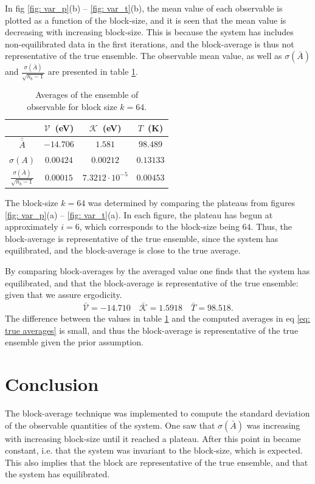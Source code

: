 \documentclass[a4paper]{article}
\newcommand{\newparagraph}{\vspace{.5cm}\noindent}
\begin{document}
\newparagraph
In fig \ref{fig: var_p}(b) -- \ref{fig: var_t}(b), the mean value of each observable is plotted as a function of the block-size, and it is seen that the mean value is decreasing with increasing block-size.
This is because the system has includes non-equilibrated data in the first iterations, and the block-average is thus not representative of the true ensemble.
The observable mean value, as well as $\sigma(\bar{A})$ and $\frac{\sigma(\bar{A})}{\sqrt{n_b - 1}}$ are presented in table \ref{ref: observables}.
\begin{table}[H]
    \centering
    \caption{Averages of the ensemble of\\ observable for block size $k = 64$.}
    \label{ref: observables}
    \begin{tabular}{|c|c|c|c|}\hline
        &$\mathcal{V}$~(eV) & $\mathcal{K}$~(eV) & $T$~(K)\\\hline
        $\bar{\bar{A}}$& $-14.706$& $1.581$ & $98.489$ \\\hline
        $\sigma(A)$ & $0.00424$ & $0.00212$  & $0.13133$ \\\hline
        $\frac{\sigma(\bar{A})}{\sqrt{n_b - 1}}$ &$0.00015$& $7.3212\cdot 10^{-5}$ & $0.00453$ \\\hline
    \end{tabular}
\end{table}\noindent
The block-size $k = 64$ was determined by comparing the plateaus from figures \ref{fig: var_p}(a)  -- \ref{fig: var_t}(a).
In each figure, the plateau has begun at approximately $i = 6$, which corresponds to the block-size being $64$.
Thus, the block-average is representative of the true ensemble, since the system has equilibrated, and the block-average is close to the true average.

\newparagraph
By comparing block-averages by the averaged value one finds that the system has equilibrated, and that the block-average is representative of the true ensemble: given that we assure ergodicity.
\begin{align}
    \bar{\mathcal{V}} = -14.710 \quad \bar{\mathcal{K}} = 1.5918\quad\bar{T} =98.518. \label{eq: true averages}
\end{align}The difference between the values in table \ref{ref: observables} and the computed averages in eq \eqref{eq: true averages} is small, and thus the block-average is representative of the true ensemble given the prior assumption.

\newpage
\section{Conclusion}
The block-average technique was implemented to compute the standard deviation of the observable quantities of the system.
One saw that $\sigma(\bar{A})$ was increasing with increasing block-size until it reached a plateau.
After this point in became constant, i.e. that the system was invariant to the block-size, which is expected.
This also implies that the block are representative of the true ensemble, and that the system has equilibrated.
\end{document}

